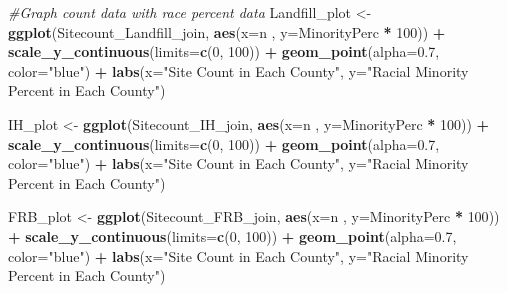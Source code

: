 \documentclass[12pt,]{article}
\newenvironment{Shaded}{\begin{snugshade}}{\end{snugshade}}
\newcommand{\KeywordTok}[1]{\textcolor[rgb]{0.13,0.29,0.53}{\textbf{#1}}}
\newcommand{\DataTypeTok}[1]{\textcolor[rgb]{0.13,0.29,0.53}{#1}}
\newcommand{\DecValTok}[1]{\textcolor[rgb]{0.00,0.00,0.81}{#1}}
\newcommand{\FloatTok}[1]{\textcolor[rgb]{0.00,0.00,0.81}{#1}}
\newcommand{\StringTok}[1]{\textcolor[rgb]{0.31,0.60,0.02}{#1}}
\newcommand{\CommentTok}[1]{\textcolor[rgb]{0.56,0.35,0.01}{\textit{#1}}}
\newcommand{\OperatorTok}[1]{\textcolor[rgb]{0.81,0.36,0.00}{\textbf{#1}}}
\newcommand{\NormalTok}[1]{#1}
\begin{document}
\begin{Shaded}
\begin{Highlighting}[]
\CommentTok{#Graph count data with race percent data}
\NormalTok{Landfill_plot <-}\StringTok{ }
\StringTok{  }\KeywordTok{ggplot}\NormalTok{(Sitecount_Landfill_join, }\KeywordTok{aes}\NormalTok{(}\DataTypeTok{x=}\NormalTok{n , }\DataTypeTok{y=}\NormalTok{MinorityPerc }\OperatorTok{*}\StringTok{ }\DecValTok{100}\NormalTok{)) }\OperatorTok{+}
\StringTok{  }\KeywordTok{scale_y_continuous}\NormalTok{(}\DataTypeTok{limits=}\KeywordTok{c}\NormalTok{(}\DecValTok{0}\NormalTok{, }\DecValTok{100}\NormalTok{)) }\OperatorTok{+}
\StringTok{  }\KeywordTok{geom_point}\NormalTok{(}\DataTypeTok{alpha=}\FloatTok{0.7}\NormalTok{, }\DataTypeTok{color=}\StringTok{"blue"}\NormalTok{) }\OperatorTok{+}
\StringTok{  }\KeywordTok{labs}\NormalTok{(}\DataTypeTok{x=}\StringTok{"Site Count in Each County"}\NormalTok{, }\DataTypeTok{y=}\StringTok{"Racial Minority Percent in Each County"}\NormalTok{)}

\NormalTok{IH_plot <-}\StringTok{ }
\StringTok{  }\KeywordTok{ggplot}\NormalTok{(Sitecount_IH_join, }\KeywordTok{aes}\NormalTok{(}\DataTypeTok{x=}\NormalTok{n , }\DataTypeTok{y=}\NormalTok{MinorityPerc }\OperatorTok{*}\StringTok{ }\DecValTok{100}\NormalTok{)) }\OperatorTok{+}
\StringTok{  }\KeywordTok{scale_y_continuous}\NormalTok{(}\DataTypeTok{limits=}\KeywordTok{c}\NormalTok{(}\DecValTok{0}\NormalTok{, }\DecValTok{100}\NormalTok{)) }\OperatorTok{+}
\StringTok{  }\KeywordTok{geom_point}\NormalTok{(}\DataTypeTok{alpha=}\FloatTok{0.7}\NormalTok{, }\DataTypeTok{color=}\StringTok{"blue"}\NormalTok{) }\OperatorTok{+}
\StringTok{  }\KeywordTok{labs}\NormalTok{(}\DataTypeTok{x=}\StringTok{"Site Count in Each County"}\NormalTok{, }\DataTypeTok{y=}\StringTok{"Racial Minority Percent in Each County"}\NormalTok{)}

\NormalTok{FRB_plot <-}\StringTok{ }
\StringTok{  }\KeywordTok{ggplot}\NormalTok{(Sitecount_FRB_join, }\KeywordTok{aes}\NormalTok{(}\DataTypeTok{x=}\NormalTok{n , }\DataTypeTok{y=}\NormalTok{MinorityPerc }\OperatorTok{*}\StringTok{ }\DecValTok{100}\NormalTok{)) }\OperatorTok{+}
\StringTok{  }\KeywordTok{scale_y_continuous}\NormalTok{(}\DataTypeTok{limits=}\KeywordTok{c}\NormalTok{(}\DecValTok{0}\NormalTok{, }\DecValTok{100}\NormalTok{)) }\OperatorTok{+}
\StringTok{  }\KeywordTok{geom_point}\NormalTok{(}\DataTypeTok{alpha=}\FloatTok{0.7}\NormalTok{, }\DataTypeTok{color=}\StringTok{"blue"}\NormalTok{) }\OperatorTok{+}
\StringTok{  }\KeywordTok{labs}\NormalTok{(}\DataTypeTok{x=}\StringTok{"Site Count in Each County"}\NormalTok{, }\DataTypeTok{y=}\StringTok{"Racial Minority Percent in Each County"}\NormalTok{)}


\end{Highlighting}
\end{Shaded}
\end{document}
